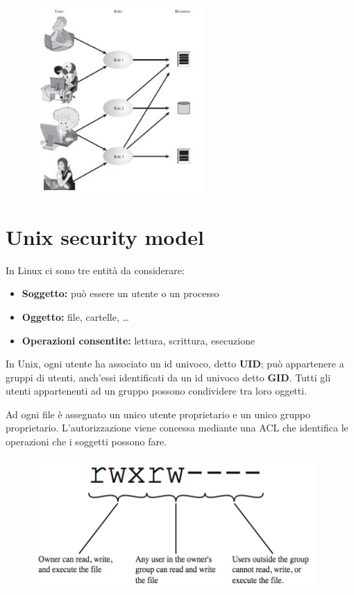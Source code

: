 \begin{figure}[H]
    \centering
    \includegraphics[width=0.7\linewidth]{chapters/3/images/rbac.png}
\end{figure}


\section{Unix security model}
In Linux ci sono tre entità da considerare:
\begin{itemize}
    \item \textbf{Soggetto:} può essere un utente o un processo 
    \item \textbf{Oggetto:} file, cartelle, \dots
    \item \textbf{Operazioni consentite:} lettura, scrittura, esecuzione 
\end{itemize}

\noindent In Unix, ogni utente ha associato un id univoco, detto \textbf{UID}; può appartenere a 
gruppi di utenti, anch'essi identificati da un id univoco detto \textbf{GID}. Tutti gli utenti 
appartenenti ad un gruppo possono condividere tra loro oggetti.

\noindent Ad ogni file è assegnato un unico utente proprietario e un unico gruppo proprietario. L'autorizzazione 
viene concessa mediante una ACL che identifica le operazioni che i soggetti possono fare.

\begin{figure}[H]
    \centering
    \includegraphics[width=0.7\linewidth]{chapters/3/images/unix-permessi.png}
\end{figure}

